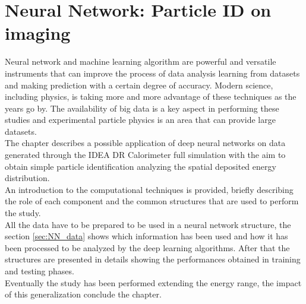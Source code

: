 \chapter{Neural Network: Particle ID on imaging} \label{sec:NN_img}
Neural network and machine learning algorithm are powerful and versatile instruments that can improve the process of data analysis learning from datasets and making prediction with a certain degree of accuracy. Modern science, including physics, is taking more and more advantage of these techniques as the years go by.
The availability of big data is a key aspect in performing these studies and experimental particle physics is an area that can provide large datasets.\\

The chapter describes a possible application of deep neural networks on data generated through the IDEA DR Calorimeter full simulation with the aim to obtain simple particle identification analyzing the spatial deposited energy distribution.\\
An introduction to the computational techniques is provided, briefly describing the role of each component and the common structures that are used to perform the study.\\

All the data have to be prepared to be used in a neural network structure, the section \ref{sec:NN_data} shows which information has been used and how it has been processed to be analyzed by the deep learning algorithms.
After that the structures are presented in details showing the performances obtained in training and testing phases.\\
Eventually the study has been performed extending the energy range, the impact of this generalization conclude the chapter.\\
\newpage

